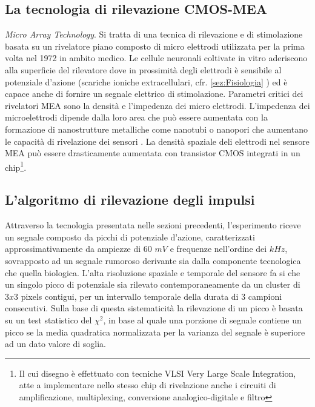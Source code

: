 \subsection{La tecnologia di rilevazione CMOS-MEA}
\label{sez:Mea}\label{sez:Rilevazione}

{\it Micro Array Technology}. Si tratta di una tecnica di rilevazione e di stimolazione basata su un rivelatore piano composto di micro elettrodi utilizzata per la prima volta nel 1972 in ambito medico. Le cellule neuronali coltivate in vitro aderiscono alla superficie del rilevatore dove in prossimità degli elettrodi è sensibile al potenziale d'azione (scariche ioniche extracellulari, cfr. \ref{sez:Fisiologia} ) ed è capace anche di fornire un segnale elettrico di stimolazione.
%
Parametri critici dei rivelatori MEA sono la densità e l'impedenza dei micro elettrodi.
%
L'impedenza dei microelettrodi dipende dalla loro area che può essere aumentata con la formazione di nanostrutture metalliche come nanotubi o nanopori che aumentano le capacità di rivelazione dei sensori \cite{Kim2014}.
%
La densità spaziale deli elettrodi nel sensore MEA può essere drasticamente aumentata con transistor CMOS integrati in un chip\footnote{Il cui disegno è effettuato con tecniche
VLSI {Very Large Scale Integration}, atte a implementare nello stesso chip di rivelazione anche i circuiti di amplificazione, multiplexing, conversione analogico-digitale e filtro}.




\subsection{L'algoritmo di rilevazione degli impulsi}
\label{sez:NeuroChip}

Attraverso la tecnologia presentata nelle sezioni precedenti, l'esperimento riceve un segnale composto da picchi di potenziale d'azione, caratterizzati approssimativamente da ampiezze di $60$ $mV$ e frequenze nell'ordine dei $kHz$, sovrapposto ad un segnale rumoroso derivante sia dalla componente tecnologica che quella biologica. L'alta risoluzione spaziale e temporale del sensore fa si che un singolo picco di potenziale sia rilevato contemporaneamente da un cluster di $3x3$ pixels contigui, per un intervallo temporale della durata di $3$ campioni consecutivi. Sulla base di questa sistematicità la rilevazione di un picco è basata su un test statistico del $\chi^{2}$, in base al quale una porzione di segnale contiene un picco se la media quadratica normalizzata per la varianza del segnale è superiore ad un dato valore di soglia.

